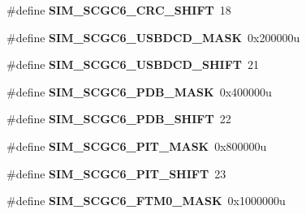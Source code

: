 \begin{DoxyCompactItemize}
\item 
\#define {\bfseries S\+I\+M\+\_\+\+S\+C\+G\+C6\+\_\+\+C\+R\+C\+\_\+\+S\+H\+I\+FT}~18\hypertarget{group__SIM__Register__Masks_gac10c9b2426df8ff8be5656590e5ad323}{}\label{group__SIM__Register__Masks_gac10c9b2426df8ff8be5656590e5ad323}

\item 
\#define {\bfseries S\+I\+M\+\_\+\+S\+C\+G\+C6\+\_\+\+U\+S\+B\+D\+C\+D\+\_\+\+M\+A\+SK}~0x200000u\hypertarget{group__SIM__Register__Masks_gaffd5a351cb6080fec607562adabf3d21}{}\label{group__SIM__Register__Masks_gaffd5a351cb6080fec607562adabf3d21}

\item 
\#define {\bfseries S\+I\+M\+\_\+\+S\+C\+G\+C6\+\_\+\+U\+S\+B\+D\+C\+D\+\_\+\+S\+H\+I\+FT}~21\hypertarget{group__SIM__Register__Masks_gae588068f46ee21f080b0a2af46a324c5}{}\label{group__SIM__Register__Masks_gae588068f46ee21f080b0a2af46a324c5}

\item 
\#define {\bfseries S\+I\+M\+\_\+\+S\+C\+G\+C6\+\_\+\+P\+D\+B\+\_\+\+M\+A\+SK}~0x400000u\hypertarget{group__SIM__Register__Masks_ga794d45b465ceb7b9cc3f1453aeab6d1f}{}\label{group__SIM__Register__Masks_ga794d45b465ceb7b9cc3f1453aeab6d1f}

\item 
\#define {\bfseries S\+I\+M\+\_\+\+S\+C\+G\+C6\+\_\+\+P\+D\+B\+\_\+\+S\+H\+I\+FT}~22\hypertarget{group__SIM__Register__Masks_ga7b7b645afc3ee38683f7e4d9d300e653}{}\label{group__SIM__Register__Masks_ga7b7b645afc3ee38683f7e4d9d300e653}

\item 
\#define {\bfseries S\+I\+M\+\_\+\+S\+C\+G\+C6\+\_\+\+P\+I\+T\+\_\+\+M\+A\+SK}~0x800000u\hypertarget{group__SIM__Register__Masks_gaf5baabd241aba695593ce6369aa56ee2}{}\label{group__SIM__Register__Masks_gaf5baabd241aba695593ce6369aa56ee2}

\item 
\#define {\bfseries S\+I\+M\+\_\+\+S\+C\+G\+C6\+\_\+\+P\+I\+T\+\_\+\+S\+H\+I\+FT}~23\hypertarget{group__SIM__Register__Masks_ga2600ceb860eb353aa61abbecdbf5b6ae}{}\label{group__SIM__Register__Masks_ga2600ceb860eb353aa61abbecdbf5b6ae}

\item 
\#define {\bfseries S\+I\+M\+\_\+\+S\+C\+G\+C6\+\_\+\+F\+T\+M0\+\_\+\+M\+A\+SK}~0x1000000u\hypertarget{group__SIM__Register__Masks_ga391c6879fab4bb2359b717ab898344f9}{}\label{group__SIM__Register__Masks_ga391c6879fab4bb2359b717ab898344f9}


\end{DoxyCompactItemize}
